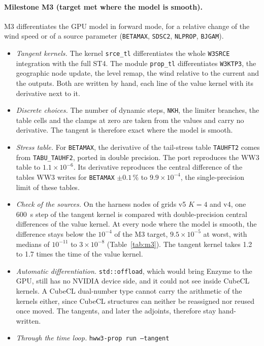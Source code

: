 \documentclass[11pt,a4paper]{article}
\begin{document}
\paragraph{Milestone M3 (target met where the model is smooth).} M3 differentiates the GPU model in
forward mode, for a relative change of the wind speed or of a source
parameter (\texttt{BETAMAX}, \texttt{SDSC2}, \texttt{NLPROP},
\texttt{BJGAM}).
\begin{itemize}
\item \emph{Tangent kernels.} The kernel \texttt{srce\_tl} differentiates
the whole \texttt{W3SRCE} integration with the full ST4. The module
\texttt{prop\_tl} differentiates \texttt{W3KTP3}, the geographic node
update, the level remap, the wind relative to the current and the outputs.
Both are written by hand, each line of the value kernel with its
derivative next to it.
\item \emph{Discrete choices.} The number of dynamic steps,
\texttt{NKH}, the limiter branches, the table cells and the clamps at zero
are taken from the values and carry no derivative. The tangent is
therefore exact where the model is smooth.
\item \emph{Stress table.} For \texttt{BETAMAX}, the derivative of the
tail-stress table \texttt{TAUHFT2} comes from \texttt{TABU\_TAUHF2},
ported in double precision. The port reproduces the WW3 table to
$1.1\times10^{-6}$. Its derivative reproduces the central difference of
the tables WW3 writes for \texttt{BETAMAX} $\pm0.1\,\%$ to
$9.9\times10^{-4}$, the single-precision limit of these tables.
\item \emph{Check of the sources.} On the harness nodes of grids v5 $K=4$
and v4, one \SI{600}{s} step of the tangent kernel is compared with
double-precision central differences of the value kernel. At every node
where the model is smooth, the difference stays below the $10^{-4}$ of the
M3 target, $9.5\times10^{-5}$ at worst, with medians of $10^{-11}$ to
$3\times10^{-8}$ (Table~\ref{tab:m3}). The tangent kernel takes 1.2 to
1.7 times the time of the value kernel.
\item \emph{Automatic differentiation.} \texttt{std::offload}, which would
bring Enzyme to the GPU, still has no NVIDIA device side, and it could not
see inside CubeCL kernels. A CubeCL dual-number type cannot carry the
arithmetic of the kernels either, since CubeCL structures can neither be
reassigned nor reused once moved. The tangents, and later the adjoints,
therefore stay hand-written.
\item \emph{Through the time loop.} \texttt{hww3-prop run --tangent}

\end{itemize}
\end{document}
